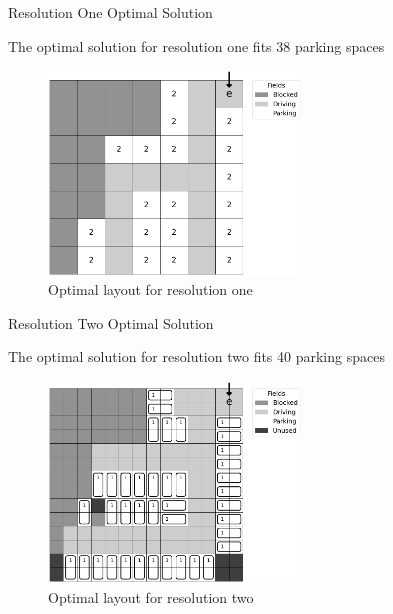 \documentclass{beamer}
\begin{document}
\begin{frame}{Resolution One Optimal Solution}

    The optimal solution for resolution one fits 38 parking spaces
    \begin{figure}
        \centering
        \includegraphics[width=0.6\textwidth]{figures/solution_r1lazy.png}
        \caption{Optimal layout for resolution one}
        \label{fig:fig}
    \end{figure}
\end{frame}

\begin{frame}{Resolution Two Optimal Solution}

    The optimal solution for resolution two fits 40 parking spaces

    \begin{figure}
        \centering
        \includegraphics[width=0.6\textwidth]{figures/solution_r2lazy.png}
        \caption{Optimal layout for resolution two}
        \label{fig:fig}
    \end{figure}
\end{frame}
\end{document}
